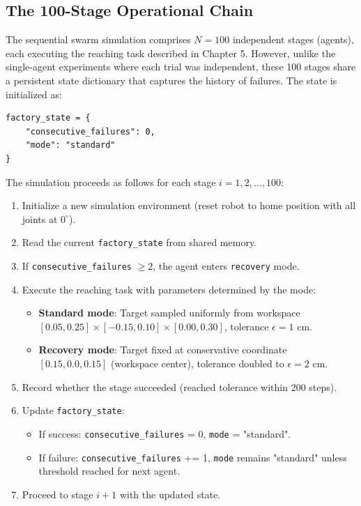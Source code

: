 \documentclass[12pt,a4paper,oneside]{report}
\begin{document}
\subsection{The 100-Stage Operational Chain}

The sequential swarm simulation comprises $N = 100$ independent stages (agents), each executing the reaching task described in Chapter 5. However, unlike the single-agent experiments where each trial was independent, these 100 stages share a persistent state dictionary that captures the history of failures. The state is initialized as:

\begin{verbatim}
factory_state = {
    "consecutive_failures": 0,
    "mode": "standard"
}
\end{verbatim}

The simulation proceeds as follows for each stage $i = 1, 2, \ldots, 100$:

\begin{enumerate}
    \item Initialize a new simulation environment (reset robot to home position with all joints at $0^\circ$).
    \item Read the current \texttt{factory\_state} from shared memory.
    \item If \texttt{consecutive\_failures} $\geq 2$, the agent enters \texttt{recovery} mode.
    \item Execute the reaching task with parameters determined by the mode:
        \begin{itemize}
            \item \textbf{Standard mode}: Target sampled uniformly from workspace $[0.05, 0.25] \times [-0.15, 0.10] \times [0.00, 0.30]$, tolerance $\epsilon = 1$ cm.
            \item \textbf{Recovery mode}: Target fixed at conservative coordinate $[0.15, 0.0, 0.15]$ (workspace center), tolerance doubled to $\epsilon = 2$ cm.
        \end{itemize}
    \item Record whether the stage succeeded (reached tolerance within 200 steps).
    \item Update \texttt{factory\_state}:
        \begin{itemize}
            \item If success: \texttt{consecutive\_failures} = 0, \texttt{mode} = "standard".
            \item If failure: \texttt{consecutive\_failures} += 1, \texttt{mode} remains "standard" unless threshold reached for next agent.
        \end{itemize}
    \item Proceed to stage $i+1$ with the updated state.
\end{enumerate}
\end{document}
